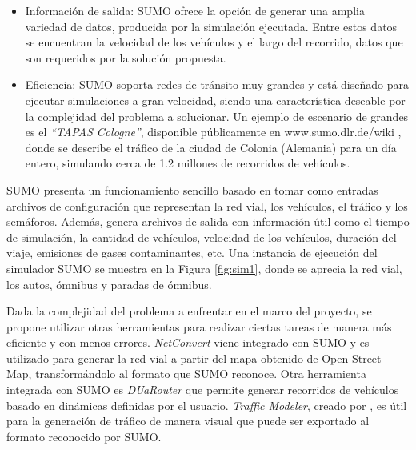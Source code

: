 \begin{itemize}
	\item Información de salida: SUMO ofrece la opción de generar una amplia variedad de datos, producida por la simulación ejecutada. Entre estos datos se encuentran la velocidad de los vehículos y el largo del recorrido, datos que son requeridos por la solución propuesta.
	
	\item Eficiencia: SUMO soporta redes de tránsito muy grandes y está diseñado para ejecutar simulaciones a gran velocidad, siendo una característica deseable por la complejidad del problema a solucionar. Un ejemplo de escenario de grandes es el \emph{``TAPAS Cologne''}, disponible públicamente en www.sumo.dlr.de/wiki , donde se describe el tráfico de la ciudad de Colonia (Alemania)  para un día entero, simulando cerca de 1.2 millones de recorridos de vehículos.
	
\end{itemize}


SUMO presenta un funcionamiento sencillo basado en tomar como entradas archivos de configuración que representan la red vial, los vehículos, el tráfico y los semáforos. Además, genera archivos de salida con información útil como el tiempo de simulación, la cantidad de vehículos, velocidad de los vehículos, duración del viaje, emisiones de gases contaminantes, etc. Una instancia de ejecución del simulador SUMO se muestra en la Figura \ref{fig:sim1}, donde se aprecia la red vial, los autos, ómnibus y paradas de ómnibus.

Dada la complejidad del problema a enfrentar en el marco del proyecto, se propone utilizar otras herramientas para realizar ciertas tareas de manera más eficiente y con menos errores. \emph{NetConvert} viene integrado con SUMO y es utilizado para generar la red vial a partir del mapa obtenido de Open Street Map, transformándolo al formato que SUMO reconoce. Otra herramienta integrada con SUMO es \emph{DUaRouter} que permite generar recorridos de vehículos basado en dinámicas definidas por el usuario. \emph{Traffic Modeler}, creado por \citet{TrafficModeler}, es útil para la generación de tráfico de manera visual que puede ser exportado al formato reconocido por SUMO. 
	


